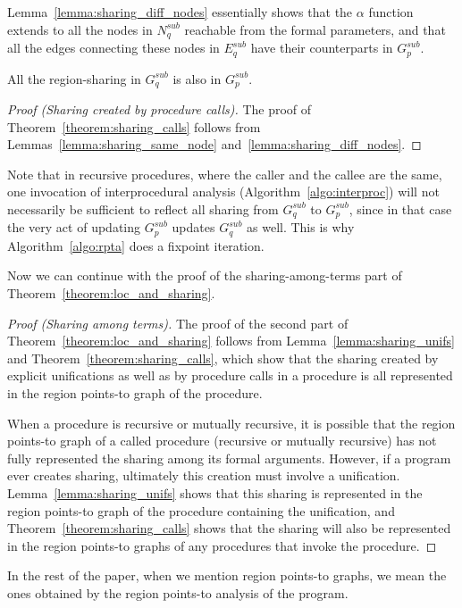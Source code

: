 \documentclass{tlp}
\begin{document}
Lemma~\ref{lemma:sharing_diff_nodes} essentially shows that
the $\alpha$ function extends to all the nodes in $N^{sub}_q$
reachable from the formal parameters,
and that all the edges connecting these nodes in $E^{sub}_q$
have their counterparts in $G^{sub}_p$.

\begin{theorem}
\label{theorem:sharing_calls}
All the region-sharing in $G^{sub}_q$ is also in $G^{sub}_p$.
\end{theorem}
\begin{proof}[Proof (Sharing created by procedure calls)]
The proof of Theorem~\ref{theorem:sharing_calls} follows from
Lemmas~\ref{lemma:sharing_same_node} and~\ref{lemma:sharing_diff_nodes}.
\end{proof}

Note that
in recursive procedures, where the caller and the callee are the same,
one invocation of interprocedural analysis (Algorithm~\ref{algo:interproc})
will not necessarily be sufficient to reflect all sharing
from $G^{sub}_q$ to $G^{sub}_p$,
since in that case the very act of updating $G^{sub}_p$
updates $G^{sub}_q$ as well.
This is why Algorithm~\ref{algo:rpta} does a fixpoint iteration.

Now we can continue with the proof of the sharing-among-terms part of
Theorem~\ref{theorem:loc_and_sharing}.
\begin{proof}[Proof (Sharing among terms)]
The proof of the second part of
Theorem~\ref{theorem:loc_and_sharing}
follows from Lemma~\ref{lemma:sharing_unifs} and
Theorem~\ref{theorem:sharing_calls},
which show that the sharing created by explicit unifications
as well as by procedure calls in a procedure is all represented in
the region points-to graph of the procedure.

When a procedure is recursive or mutually recursive,
it is possible that the region points-to graph of a called procedure
(recursive or mutually recursive) has not fully represented the sharing
among its formal arguments.
However, if a program ever creates sharing,
ultimately this creation must involve a unification.
Lemma~\ref{lemma:sharing_unifs} shows that
this sharing is represented in the region points-to graph of
the procedure containing the unification,
and Theorem~\ref{theorem:sharing_calls} shows that
the sharing will also be represented in
the region points-to graphs of any procedures that invoke the procedure.
\end{proof}

In the rest of the paper,
when we mention region points-to graphs,
we mean the ones obtained by the region points-to analysis of the program.
\end{document}
